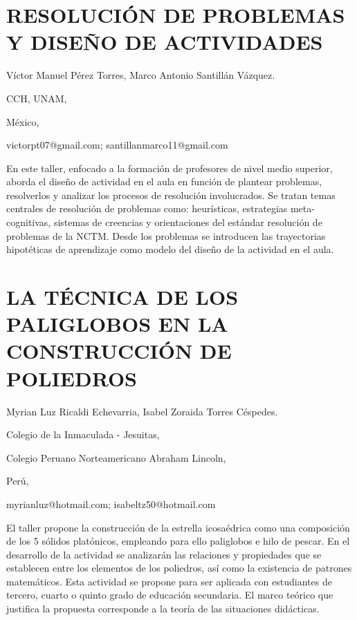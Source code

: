 \section{RESOLUCIÓN DE PROBLEMAS Y DISEÑO DE ACTIVIDADES}

\begin{datos}

Víctor Manuel Pérez Torres, Marco Antonio Santillán Vázquez.

CCH, UNAM,

México,

victorpt07@gmail.com; santillanmarco11@gmail.com

\end{datos}

En este taller, enfocado a la formación de profesores de nivel medio
superior, aborda el diseño de actividad en el aula en función de plantear
problemas, resolverlos y analizar los procesos de resolución involucrados.
Se tratan temas centrales de resolución de problemas como: heurísticas,
estrategias meta-cognitivas, sistemas de creencias y orientaciones
del estándar resolución de problemas de la NCTM. Desde los problemas
se introducen las trayectorias hipotéticas de aprendizaje como modelo
del diseño de la actividad en el aula. 


\section{LA TÉCNICA DE LOS PALIGLOBOS EN LA CONSTRUCCIÓN DE POLIEDROS}

\begin{datos}

Myrian Luz Ricaldi Echevarria, Isabel Zoraida Torres Céspedes.

Colegio de la Inmaculada - Jesuitas, 

Colegio Peruano Norteamericano Abraham Lincoln,

Perú,

myrianluz@hotmail.com; isabeltz50@hotmail.com

\end{datos}

El taller propone la construcción de la estrella icosaédrica como
una composición de los 5 sólidos platónicos, empleando para ello paliglobos
e hilo de pescar. En el desarrollo de la actividad se analizarán las
relaciones y propiedades que se establecen entre los elementos de
los poliedros, así como la existencia de patrones matemáticos. Esta
actividad se propone para ser aplicada con estudiantes de tercero,
cuarto o quinto grado de educación secundaria. El marco teórico que
justifica la propuesta corresponde a la teoría de las situaciones
didácticas. 


